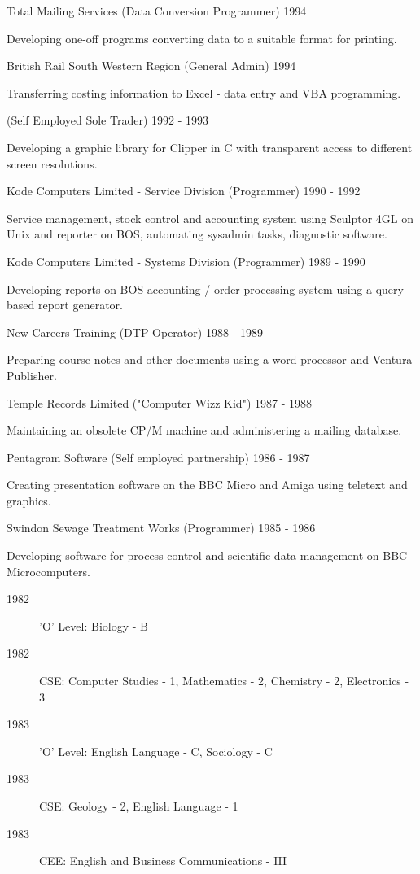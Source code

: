\jobHeading
    {Total Mailing Services (Data Conversion Programmer)}
    {1994}

Developing one-off programs converting data to a suitable format for printing.

\jobHeading
    {British Rail South Western Region (General Admin)}
    {1994}

Transferring costing information to Excel - data entry and VBA programming.

\jobHeading
    {(Self Employed Sole Trader)}
    {1992 - 1993}

Developing a graphic library for Clipper in C
with transparent access to different screen resolutions.

\jobHeading
    {Kode Computers Limited - Service Division (Programmer)}
    {1990 - 1992}

Service management, stock control and accounting system using
Sculptor 4GL on Unix and reporter on BOS,
automating sysadmin tasks,
diagnostic software.

\jobHeading
    {Kode Computers Limited - Systems Division (Programmer)}
    {1989 - 1990}

Developing reports on BOS accounting / order processing system
using a query based report generator.

\jobHeading
    {New Careers Training (DTP Operator)}
    {1988 - 1989}

Preparing course notes and other documents
using a word processor and Ventura Publisher.

\jobHeading
    {Temple Records Limited ("Computer Wizz Kid")}
    {1987 - 1988}

Maintaining an obsolete CP/M machine and administering a mailing database.

\jobHeading
    {Pentagram Software (Self employed partnership)}
    {1986 - 1987}

Creating presentation software on the BBC Micro and Amiga
using teletext and graphics.

\jobHeading
    {Swindon Sewage Treatment Works (Programmer)}
    {1985 - 1986}

Developing software for process control and scientific data management
on BBC Microcomputers.



\begin{description}
    \item[1982] 'O' Level: Biology - B
    \item[1982] CSE: Computer Studies - 1, Mathematics - 2,
        Chemistry - 2, Electronics - 3
    \item[1983] 'O' Level: English Language - C, Sociology - C
    \item[1983] CSE: Geology - 2, English Language - 1
    \item[1983] CEE: English and Business Communications - III
\end{description}

